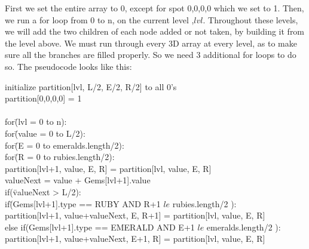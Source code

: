 \documentclass{article}
\begin{document}
\begin{enumerate}
First we set the entire array to 0, except for spot 0,0,0,0 which we set to 1. Then, we run a for loop from 0 to n, on the current level ,$lvl$. Throughout these levels, we will add the two children of each node added or not taken, by building it from the level above. We must run through every 3D array at every level, as to make sure all the branches are filled properly. So we need 3 additional for loops to do so. The pseudocode looks like this:

\begin{tabbing}
initialize partition[lvl, L/2, E/2, R/2] to all 0's\\
partition[0,0,0,0] = 1\\
\\
for\=(lvl = 0 to n):\\
\>	for\=(value = 0 to L/2):\\
\>\>	for\=(E = 0 to emeralds.length/2):\\
\>\>\>	for\=(R = 0 to rubies.length/2):\\
\>\>\>\>partition[lvl+1, value, E, R] = partition[lvl, value, E, R]\\
\>\>\>\>valueNext = value + Gems[lvl+1].value\\
\>\>\>\>if(\=valueNext > L/2):\\
\>\>\>\>\>if\=(Gems[lvl+1].type == RUBY AND R+1 $le$ rubies.length/2 ):\\
\>\>\>\>\>\>partition[lvl+1, value+valueNext, E, R+1] = partition[lvl, value, E, R]\\
\>\>\>\>\>else if(Gems[lvl+1].type == EMERALD AND E+1 $le$ emeralds.length/2 ):\\
\>\>\>\>\>\>partition[lvl+1, value+valueNext, E+1, R] = partition[lvl, value, E, R]\\
\end{tabbing}



\end{enumerate}
\end{document}
